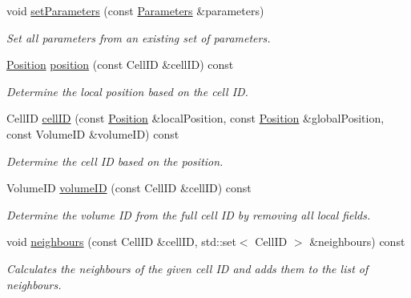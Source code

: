 \begin{DoxyCompactItemize}
void \hyperlink{class_d_d4hep_1_1_geometry_1_1_segmentation_object_a8246875bc5c3dd4c4613bf56350690da}{setParameters} (const \hyperlink{class_d_d4hep_1_1_geometry_1_1_segmentation_object_adb4bb039e0cd15ea9fbe0232d07c49cc}{Parameters} \&parameters)
\begin{DoxyCompactList}\small\item\em Set all parameters from an existing set of parameters. \item\end{DoxyCompactList}\item 
\hyperlink{namespace_d_d4hep_1_1_geometry_a55083902099d03506c6db01b80404900}{Position} \hyperlink{class_d_d4hep_1_1_geometry_1_1_segmentation_object_a48c53872382d4ecd3f87ea82298a435f}{position} (const CellID \&cellID) const 
\begin{DoxyCompactList}\small\item\em Determine the local position based on the cell ID. \item\end{DoxyCompactList}\item 
CellID \hyperlink{class_d_d4hep_1_1_geometry_1_1_segmentation_object_ace43e4d369d28910913b6f2775291e37}{cellID} (const \hyperlink{namespace_d_d4hep_1_1_geometry_a55083902099d03506c6db01b80404900}{Position} \&localPosition, const \hyperlink{namespace_d_d4hep_1_1_geometry_a55083902099d03506c6db01b80404900}{Position} \&globalPosition, const VolumeID \&volumeID) const 
\begin{DoxyCompactList}\small\item\em Determine the cell ID based on the position. \item\end{DoxyCompactList}\item 
VolumeID \hyperlink{class_d_d4hep_1_1_geometry_1_1_segmentation_object_a1e49d904fd608d2ad07299269e7a1348}{volumeID} (const CellID \&cellID) const 
\begin{DoxyCompactList}\small\item\em Determine the volume ID from the full cell ID by removing all local fields. \item\end{DoxyCompactList}\item 
void \hyperlink{class_d_d4hep_1_1_geometry_1_1_segmentation_object_a923aab6baaf9590932b3fe05b305edb2}{neighbours} (const CellID \&cellID, std::set$<$ CellID $>$ \&neighbours) const 
\begin{DoxyCompactList}\small\item\em Calculates the neighbours of the given cell ID and adds them to the list of neighbours. \item\end{DoxyCompactList}\end{DoxyCompactItemize}
